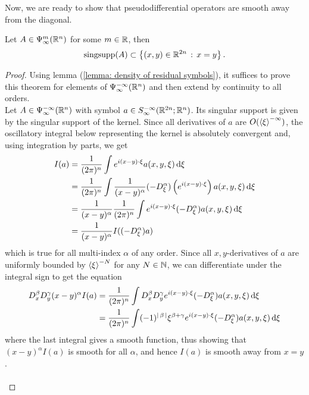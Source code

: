 \documentclass[12pt]{article}
\begin{document}
Now, we are ready to show that pseudodifferential operators are smooth away from the diagonal. 

\begin{fprop}
    Let $A \in \Psi^m_\infty(\R^n)$ for some $m \in \R$, then
    \[
    \mathrm{sing supp}(A) \subset \set{(x, y) \in \R^{2n} \wh x = y}. 
    \]
\end{fprop}
\begin{proof}
    Using lemma (\ref{lemma: density of residual symbols}), it suffices to prove this theorem for elements of $\Psi^{-\infty}_\infty(\R^n)$ and then extend by continuity to all orders. \\
    
    Let $A \in \Psi^{-\infty}_\infty(\R^n)$ with symbol $a \in S^{-\infty}_\infty(\R^{2n}; \R^n)$. Its singular support is given by the singular support of the kernel. Since all derivatives of $a$ are $O(\sym[\xi]^{-\infty})$, the oscillatory integral below representing the kernel is absolutely convergent  and, using integration by parts, we get
    \begin{align*}
        I(a) 
        & = \frac{1}{(2\pi)^n} \int e^{i(x - y) \cdot \xi} a(x, y, \xi) \d[\xi] \\
        & = \frac{1}{(2\pi)^n}  \int \frac{1}{(x - y)^\alpha} (-D^\alpha_\xi) \brac{e^{i(x - y) \cdot \xi} }a(x, y, \xi) \d[\xi] \\
        & = \frac{1}{(x - y)^\alpha} \frac{1}{(2\pi)^n} \int e^{i(x - y) \cdot \xi} (-D^\alpha_\xi) a(x, y, \xi) \d[\xi] \\
        & = \frac{1}{(x - y)^\alpha} I((-D^\alpha_\xi)a)
    \end{align*}
    which is true for all multi-index $\alpha$ of any order. Since all $x, y$-derivatives of $a$ are uniformly bounded by $\sym[\xi]^{-N}$ for any $N \in \N$, we can differentiate under the integral sign to get the equation
    \begin{align*}
        D^\beta_x D^\gamma_y (x - y)^\alpha I(a) 
        & = \frac{1}{(2\pi)^n} \int D^\beta_x D^\gamma_y e^{i(x - y) \cdot \xi} (-D^\alpha_\xi) a(x, y, \xi) \d[\xi] \\
        & = \frac{1}{(2\pi)^n} \int (-1)^{\abs{\beta}}\xi^{\beta + \gamma}e^{i(x - y) \cdot \xi} (-D^\alpha_\xi) a(x, y, \xi) \d[\xi] \\
    \end{align*}
    where the last integral gives a smooth function, thus showing that $(x - y)^\alpha I(a)$ is smooth for all $\alpha$, and hence $I(a)$ is smooth away from $x = y$. \\
    \\
%    
%    
\end{proof}
\end{document}
